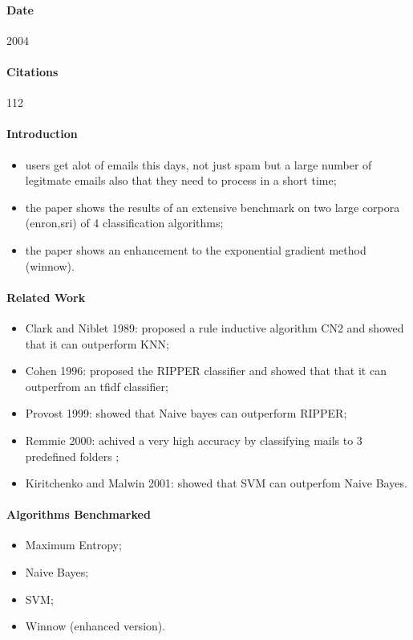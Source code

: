 \documentclass[12pt]{article}
\begin{document}
\paragraph{Date} 2004
\paragraph{Citations} 112
\paragraph{Introduction}
\begin{itemize}
  \item users get alot of emails this days, not just spam but a large number of legitmate emails also that they need to process in a short time;
  \item the paper shows the results of an extensive benchmark on two large corpora (enron,sri) of 4 classification algorithms;
  \item the paper shows an enhancement to the exponential gradient method (winnow).
\end{itemize}

\paragraph{Related Work}
\begin{itemize}
  \item Clark and Niblet 1989: proposed a rule inductive algorithm CN2 and showed that it can outperform KNN;
  \item Cohen 1996: proposed the RIPPER classifier and showed that that it can outperfrom an tfidf classifier;
  \item Provost 1999: showed that Naive bayes can outperform RIPPER;
  \item Remmie 2000: achived a very high accuracy by classifying mails to 3 predefined folders ;
  \item Kiritchenko and Malwin 2001: showed that SVM can outperfom Naive Bayes.
\end{itemize}


\paragraph{Algorithms Benchmarked}
\begin{itemize}
  \item Maximum Entropy;
  \item Naive Bayes;
  \item SVM;
  \item Winnow (enhanced version).
\end{itemize}
\end{document}
